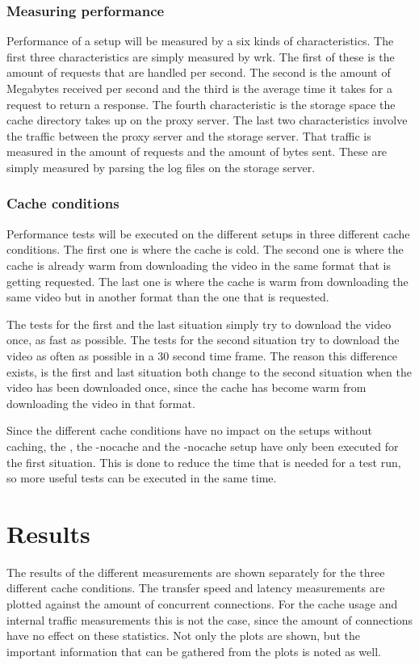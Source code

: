 \documentclass[twoside,openright]{uva-bachelor-thesis}
\begin{document}
\subsubsection{Measuring performance}
Performance of a setup will be measured by a six kinds of characteristics. The
first three characteristics are simply measured by wrk. The first of these is
the amount of requests that are handled per second. The second is the amount of
Megabytes received per second and the third is the average time it takes for a
request to return a response. The fourth characteristic is the storage space the
cache directory takes up on the proxy server. The last two characteristics
involve the traffic between the proxy server and the storage server. That
traffic is measured in the amount of requests and the amount of bytes sent.
These are simply measured by parsing the log files on the storage server.

\subsubsection{Cache conditions}
Performance tests will be executed on the different setups in three different
cache conditions. The first one is where the cache is cold. The second one is
where the cache is already warm from downloading the video in the same format
that is getting requested. The last one is where the cache is warm from
downloading the same video but in another format than the one that is requested.

The tests for the first and the last situation simply try to download the video
once, as fast as possible. The tests for the second situation try to download
the video as often as possible in a 30 second time frame. The reason this
difference exists, is the first and last situation both change to the second
situation when the video has been downloaded once, since the cache has become
warm from downloading the video in that format.

Since the different cache conditions have no impact on the setups without
caching, the \ipp, the \cdn-nocache and the \lt-nocache setup have only been
executed for the first situation. This is done to reduce the time that is needed
for a test run, so more useful tests can be executed in the same time.





\section{Results}
The results of the different measurements are shown separately for the three
different cache conditions. The transfer speed and latency measurements are
plotted against the amount of concurrent connections. For the cache usage and
internal traffic measurements this is not the case, since the amount of
connections have no effect on these statistics. Not only the plots are shown,
but the important information that can be gathered from the plots is noted as
well.
\end{document}
